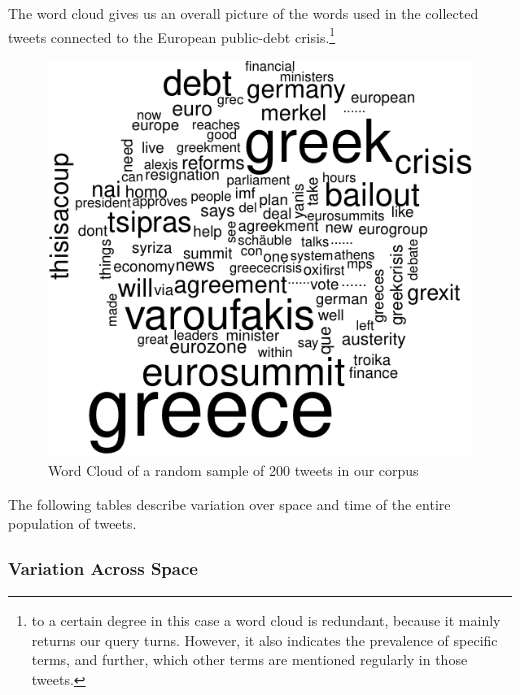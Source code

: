 \documentclass[]{article}
\let\rmarkdownfootnote\footnote%
\def\footnote{\protect\rmarkdownfootnote}
\begin{document}
The word cloud gives us an overall picture of the words used in the
collected tweets connected to the European public-debt crisis.\footnote{to
  a certain degree in this case a word cloud is redundant, because it
  mainly returns our query turns. However, it also indicates the
  prevalence of specific terms, and further, which other terms are
  mentioned regularly in those tweets.}

\begin{figure}[htbp]
\centering
\includegraphics{fin_paper_files/figure-latex/unnamed-chunk-2-1.pdf}
\caption{Word Cloud of a random sample of 200 tweets in our corpus}
\end{figure}

The following tables describe variation over space and time of the
entire population of tweets.

\subsubsection{Variation Across Space}\label{variation-across-space}
\end{document}
